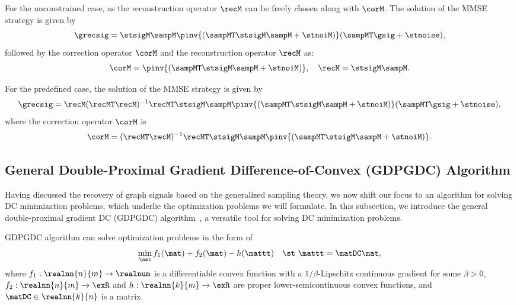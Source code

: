 \documentclass[journal]{IEEEtran}
\begin{document}
For the unconstrained case, as the reconstruction operator $\recM$ can be freely chosen along with $\corM$. 
The solution of the MMSE strategy is given by
\begin{equation}\label{st_un_MMSE}
    \grecsig = \stsigM \sampM \pinv{(\sampMT \stsigM \sampM + \stnoiM)} (\sampMT \gsig + \stnoise),
\end{equation}
followed by the correction operator $\corM$ and the reconstruction operator $\recM$ as:
\begin{equation} \label{st_un_corM_recM}
    \corM = \pinv{(\sampMT \stsigM \sampM + \stnoiM)}, \quad
    \recM = \stsigM \sampM.
\end{equation}

For the predefined case, the solution of the MMSE strategy is given by
\begin{equation}\label{st_pre_MMSE}
    \grecsig = \recM (\recMT \recM)^{-1} \recMT \stsigM \sampM \pinv{(\sampMT \stsigM \sampM + \stnoiM)} (\sampMT \gsig + \stnoise),
\end{equation}
where the correction operator $\corM$ is
\begin{equation}\label{st_pre_corM}
    \corM = (\recMT \recM)^{-1} \recMT \stsigM \sampM \pinv{(\sampMT \stsigM \sampM + \stnoiM)}.
\end{equation}



\subsection{General Double-Proximal Gradient Difference-of-Convex (GDPGDC) Algorithm}
\label{subsec:GDPGDC}
Having discussed the recovery of graph signals based on the generalized sampling theory, we now shift our focus to an algorithm for solving DC minimization problems, which underlie the optimization problems we will formulate.
In this subsection, we introduce the general double-proximal gradient DC (GDPGDC) algorithm~\cite{banert2019general}, a versatile tool for solving DC minimization problems.

GDPGDC algorithm can solve optimization problems in the form of
\begin{equation}
    \label{prob:DC_general}
    \min_{\mat} f_1(\mat) + f_2(\mat) - h(\mattt) \quad \st \ \mattt = \matDC \mat,
\end{equation}
where $f_1: \realnn{n}{m} \rightarrow \realnum$ is a differentiable convex function with a $1/\beta$-Lipschitz continuous gradient for some $\beta > 0$, $f_2:\realnn{n}{m} \rightarrow \exR$ and $h:\realnn{k}{m} \rightarrow \exR$ are proper lower-semicontinuous convex functions, and $\matDC \in \realnn{k}{n}$ is a matrix.
\end{document}
